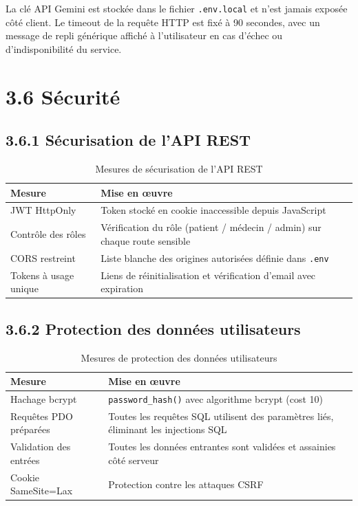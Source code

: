 \documentclass[12pt,a4paper]{report}
\begin{document}
La cl\'e API Gemini est stock\'ee dans le fichier \texttt{.env.local} et n'est jamais expos\'ee c\^ot\'e client. Le timeout de la requ\^ete HTTP est fix\'e \`a 90 secondes, avec un message de repli g\'en\'erique affich\'e \`a l'utilisateur en cas d'\'echec ou d'indisponibilit\'e du service.

\section*{3.6 S\'ecurit\'e}

\subsection*{3.6.1 S\'ecurisation de l'API REST}

\begin{table}[H]
\centering
\renewcommand{\arraystretch}{1.4}
\caption{Mesures de s\'ecurisation de l'API REST}
\begin{tabularx}{\textwidth}{|l|X|}
\hline
\textbf{Mesure} & \textbf{Mise en \oe{}uvre} \\
\hline
JWT HttpOnly           & Token stock\'e en cookie inaccessible depuis JavaScript \\
\hline
Contr\^ole des r\^oles & V\'erification du r\^ole (patient / m\'edecin / admin) sur chaque route sensible \\
\hline
CORS restreint         & Liste blanche des origines autoris\'ees d\'efinie dans \texttt{.env} \\
\hline
Tokens \`a usage unique & Liens de r\'einitialisation et v\'erification d'email avec expiration \\
\hline
\end{tabularx}
\end{table}

\subsection*{3.6.2 Protection des donn\'ees utilisateurs}

\begin{table}[H]
\centering
\renewcommand{\arraystretch}{1.4}
\caption{Mesures de protection des donn\'ees utilisateurs}
\begin{tabularx}{\textwidth}{|l|X|}
\hline
\textbf{Mesure} & \textbf{Mise en \oe{}uvre} \\
\hline
Hachage bcrypt              & \texttt{password\_hash()} avec algorithme bcrypt (cost 10) \\
\hline
Requ\^etes PDO pr\'epar\'ees & Toutes les requ\^etes SQL utilisent des param\`etres li\'es, \'eliminant les injections SQL \\
\hline
Validation des entr\'ees    & Toutes les donn\'ees entrantes sont valid\'ees et assainies c\^ot\'e serveur \\
\hline
Cookie SameSite=Lax         & Protection contre les attaques CSRF \\
\hline
\end{tabularx}
\end{table}
\end{document}

